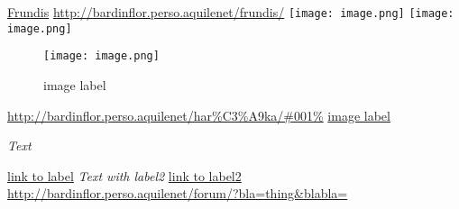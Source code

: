 \href{http://bardinflor.perso.aquilenet/frundis/}{Frundis}
\url{http://bardinflor.perso.aquilenet/frundis/}
\texttt{[image: image.png]}
\texttt{[image: image.png]}

\begin{center}
\begin{figure}[htbp]
\texttt{[image: image.png]}
\caption{image label}
\label{fig:1}
\end{figure}
\end{center}

\url{http://bardinflor.perso.aquilenet/har\%C3\%A9ka/#001\%}
\hyperref[fig:1]{image label}

\hypertarget{label1}{\emph{Text}}
\hyperlink{label1}{link to label}
\hypertarget{label2}{\emph{Text with label2}}
\hyperlink{label2}{link to label2}
\url{http://bardinflor.perso.aquilenet/forum/?bla=thing&blabla=}

